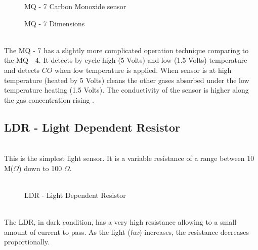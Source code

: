 \documentclass[12pt,a4paper]{report}
\begin{document}
\begin{figure}[H]
\caption{MQ - 7 Carbon Monoxide  sensor}
\caption{MQ - 7 Dimensions}
\end{figure}
\ \\
The MQ - 7 has a slightly more complicated operation technique comparing to the MQ - 4. It detects by cycle high (5 Volts) and low (1.5 Volts) temperature and detects $CO$ when low temperature is applied. When sensor is at high temperature (heated by 5 Volts) cleans the other gases absorbed under the low temperature heating (1.5 Volts). The conductivity of the sensor is higher along the gas concentration rising \cite{website:mq7_datasheet}.
\ \\
%
\subsection{LDR - Light Dependent Resistor}
\ \\
This is the simplest light sensor. It is a variable resistance of a range between 10 M($\Omega$) down to 100 $\Omega$.
\\ \
\begin{figure}[H]
\centering
\caption{LDR - Light Dependent Resistor}
\end{figure}
\ \\
The LDR, in dark condition, has a very high resistance allowing to a small amount of current to pass. As the light (\textit{lux}) increases, the resistance decreases proportionally.
\ \\
%
\end{document}
